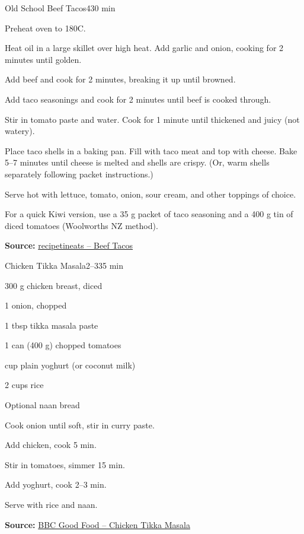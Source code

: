 \begin{recipebox}{Old School Beef Tacos}{4}{30 min}
\begin{method}
  \item Preheat oven to 180\degree C.
  \item Heat oil in a large skillet over high heat. Add garlic and onion, cooking for 2 minutes until golden.
  \item Add beef and cook for 2 minutes, breaking it up until browned.
  \item Add taco seasonings and cook for 2 minutes until beef is cooked through.
  \item Stir in tomato paste and water. Cook for 1 minute until thickened and juicy (not watery).
  \item Place taco shells in a baking pan. Fill with taco meat and top with cheese. Bake 5–7 minutes until cheese is melted and shells are crispy. (Or, warm shells separately following packet instructions.)
  \item Serve hot with lettuce, tomato, onion, sour cream, and other toppings of choice.
\end{method}

\begin{notes}
For a quick Kiwi version, use a 35 g packet of taco seasoning and a 400 g tin of diced tomatoes (Woolworths NZ method).
\end{notes}

\textbf{Source:} \href{https://www.recipetineats.com/ground-beef-tacos-recipe/}{recipetineats – Beef Tacos}
\end{recipebox}
\newpage
\begin{recipebox}{Chicken Tikka Masala}{2--3}{35 min}
\begin{ingredients}
  \item 300 g chicken breast, diced
  \item 1 onion, chopped
  \item 1 tbsp tikka masala paste
  \item 1 can (400 g) chopped tomatoes
  \item {} cup plain yoghurt (or coconut milk)
  \item 2 cups rice
  \item Optional naan bread
\end{ingredients}

\begin{method}
  \item Cook onion until soft, stir in curry paste.
  \item Add chicken, cook 5 min.
  \item Stir in tomatoes, simmer 15 min.
  \item Add yoghurt, cook 2–3 min.
  \item Serve with rice and naan.
\end{method}
\textbf{Source:} \href{https://www.bbcgoodfood.com/recipes/chicken-tikka-masala}{BBC Good Food – Chicken Tikka Masala}
\end{recipebox}
\newpage

